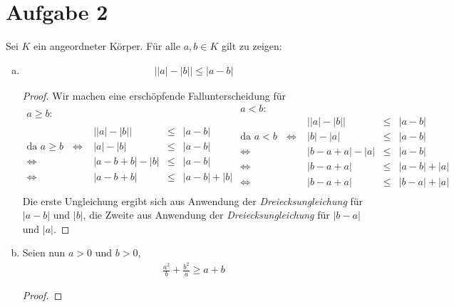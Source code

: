 \documentclass{scrreprt}
\begin{document}
	\section*{Aufgabe 2}
	Sei $K$ ein angeordneter Körper. Für alle $a,b \in K$ gilt zu zeigen:
		\begin{enumerate}[(a)]
			\item
				\begin{align*}
					\bigl| \left|a\right| - \left|b\right| \bigr| \leq |a -b|
				\end{align*}
				\begin{proof}
				Wir machen eine erschöpfende Fallunterscheidung für
					\begin{equation*}
						\begin{aligned}
							a \geq b:\\\\
							&\bigl| \left|a\right| - \left|b\right| \bigr| & \leq& |a -b|\\
							\text{da $a \geq b$ } \Leftrightarrow &| a | - | b | & \leq& | a - b | \\
							\Leftrightarrow & | a - b + b | - | b | & \leq& | a - b |\\
							\Leftrightarrow & | a - b + b | & \leq& | a - b | + | b |\\
						\end{aligned}
						\begin{aligned}
							a < b:\\
							&\bigl| \left|a\right| - \left|b\right| \bigr| & \leq& |a -b|\\
							\text{da $a < b$ } \Leftrightarrow &| b | - | a | & \leq& | a - b | \\
							\Leftrightarrow & | b - a + a | - | a | & \leq& | a - b |\\
							\Leftrightarrow & | b - a + a | & \leq& | a - b | + | a |\\
							\Leftrightarrow & | b - a + a | & \leq& | b - a | + | a |\\
						\end{aligned}
					\end{equation*}
					Die erste Ungleichung ergibt sich aus Anwendung der \emph{Dreiecksungleichung} für $|a - b|$ und $|b|$, die Zweite aus Anwendung der \emph{Dreiecksungleichung} für $|b-a|$ und $|a|$.
				\end{proof}
			\item
				Seien nun $a>0$ und $b>0$,
				\begin{align*}
					\frac{a^2}{b} + \frac{b^2}{a} \geq a + b
				\end{align*}
				\begin{proof}

				\end{proof}
		\end{enumerate}
\end{document}
